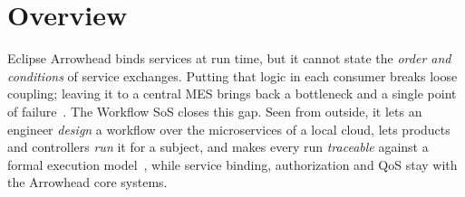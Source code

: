 \documentclass[a4paper]{arrowhead}
\begin{document}

\ArrowheadSetup

\begin{center}
  \vspace*{1cm}
  \huge{\arrowtitle}

  \vspace*{0.2cm}
  \LARGE{\arrowtype}
  \vspace*{1cm}

  
  \vspace*{\fill}

  

  \vspace*{1cm}
  \vspace*{\fill}

  \begin{abstract}
    This document describes the Arrowhead Workflow System of Systems as a black box: the workflow capability it adds to an Eclipse Arrowhead local cloud, how it is meant to be used, its properties and delimitations, and the services at its boundary. The white-box design is given in the SoSDD. Documentation edition 5.4.0.
  \end{abstract}

  \vspace*{1cm}
\end{center}

\newpage

\tableofcontents
\newpage

\section{Overview}
\label{sec:overview}
Eclipse Arrowhead binds services at run time, but it cannot state the \emph{order and conditions} of service exchanges.
Putting that logic in each consumer breaks loose coupling; leaving it to a central MES brings back a bottleneck and a
single point of failure~\cite{represa2022,derhamy2018}. The Workflow SoS closes this gap. Seen from outside, it lets an
engineer \emph{design} a workflow over the microservices of a local cloud, lets products and controllers \emph{run} it
for a subject, and makes every run \emph{traceable} against a formal execution model~\cite{varga2026}, while service
binding, authorization and QoS stay with the Arrowhead core systems.
\end{document}
